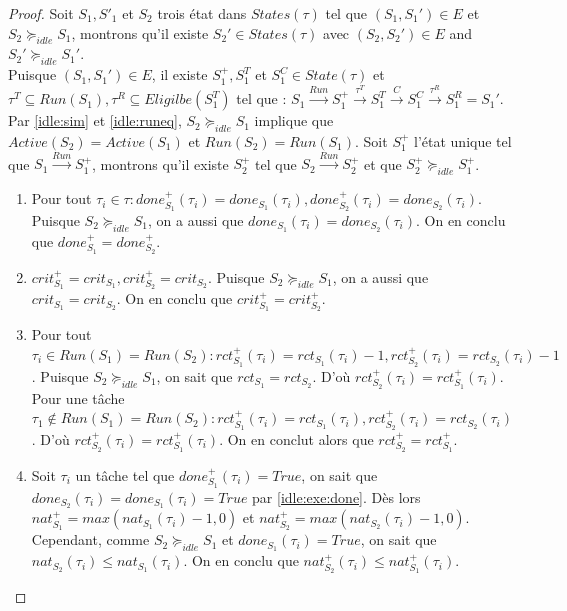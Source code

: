 \documentclass[12pt,a4paper,oneside]{book}
\theoremstyle{break}
\theoremstyle{breakplain}
\begin{document}
\begin{proof}
Soit $S_1, S'_1$ et $S_2$ trois état dans $States(\tau)$ tel que $(S_1, S_1') \in E$ et $S_2 \succeq_{idle}S_1$, montrons qu'il existe $S_2' \in States(\tau)$ avec $(S_2, S_2') \in E$ and $S_2' \succeq_{idle} S_1'$.\\

Puisque $(S_1, S_1') \in E$, il existe $S^{+}_1, S^{T}_1$ et $S^{C}_1 \in State(\tau)$ et $\tau^T \subseteq Run(S_1),\tau^R \subseteq Eligilbe(S^{T}_1) $ tel que : $S_1\xrightarrow{Run}S^{+}_1\xrightarrow{\tau^T}S^{T}_1\xrightarrow{C}S^{C}_1\xrightarrow{\tau^R}S_1^R=S_1'$.\\

Par \autoref{idle:sim} et \autoref{idle:runeq}, $S_2 \succeq_{idle} S_1$ implique que $Active(S_2) = Active(S_1)$ et $Run(S_2) = Run(S_1)$. Soit $S^+_1$ l'état unique tel que $S_1\xrightarrow{Run}S^{+}_1$, montrons qu'il existe $S^+_2$ tel que $S_2\xrightarrow{Run}S^{+}_2$ et que $S^+_2 \succeq_{idle} S^+_1$.
\begin{enumerate}


\item \label{idle:exe:done} Pour tout  $\tau_i \in \tau : done_{S_1}^+(\tau_i) = done_{S_1}(\tau_i), done_{S_2}^+(\tau_i) = done_{S_2}(\tau_i)$. Puisque $S_2 \succeq_{idle} S_1$, on a aussi que $done_{S_1}(\tau_i) = done_{S_2}(\tau_i)$. On en conclu que $done_{S_1}^+ = done_{S_2}^+$.

\item $crit_{S_1}^+ = crit_{S_1}, crit_{S_2}^+ = crit_{S_2}$. Puisque $S_2 \succeq_{idle} S_1$, on a aussi que $crit_{S_1} = crit_{S_2}$. On en conclu que $crit_{S_1}^+ = crit_{S_2}^+$.

\item Pour tout $\tau_i \in Run(S_1) = Run(S_2) : rct_{S_1}^+(\tau_i) = rct_{S_1}(\tau_i) -1, rct_{S_2}^+(\tau_i) = rct_{S_2}(\tau_i) -1$. Puisque $S_2 \succeq_{idle} S_1$, on sait que $rct_{S_1} = rct_{S_2}$. D'où $rct_{S_2}^+(\tau_i) = rct_{S_1}^+(\tau_i)$.\\
Pour une tâche $\tau_1 \notin Run(S_1) = Run(S_2) : rct_{S_1}^+(\tau_i) = rct_{S_1}(\tau_i), rct_{S_2}^+(\tau_i) = rct_{S_2}(\tau_i)$. D'où $rct_{S_2}^+(\tau_i) = rct_{S_1}^+(\tau_i)$. On en conclut alors que $rct_{S_2}^+ = rct_{S_1}^+$.

\item Soit $\tau_i$ un tâche tel que $done_{S_1}^+(\tau_i) = True$, on sait que $done_{S_2}(\tau_i) = done_{S_1}(\tau_i) = True$ par \autoref{idle:exe:done}. Dès lors $nat_{S_1}^+ = max(nat_{S_1}(\tau_i)-1, 0)$ et $nat_{S_2}^+ = max(nat_{S_2}(\tau_i)-1, 0)$. Cependant, comme $S_2 \succeq_{idle} S_1$ et $done_{S_1}(\tau_i) = True$, on sait que $nat_{S_2}(\tau_i) \leq nat_{S_1}(\tau_i)$. On en conclu que $nat_{S_2}^+(\tau_i) \leq nat_{S_1}^+(\tau_i)$.


\end{enumerate}
\end{proof}
\end{document}
